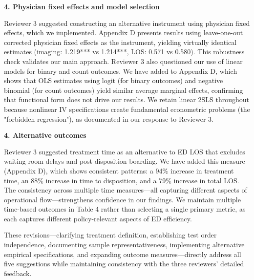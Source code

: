 \documentclass[11pt]{article}
\newcommand{\1}{\hbox{\rm 1\kern-.35em 1}}
\begin{document}
\textbf{4. Physician fixed effects and model selection}

Reviewer 3 suggested constructing an alternative instrument using physician fixed effects, which we implemented. Appendix D presents results using leave-one-out corrected physician fixed effects as the instrument, yielding virtually identical estimates (imaging: 1.219*** vs 1.214***, LOS: 0.571 vs 0.580). This robustness check validates our main approach. Reviewer 3 also questioned our use of linear models for binary and count outcomes. We have added to Appendix D, which shows that OLS estimates using logit (for binary outcomes) and negative binomial (for count outcomes) yield similar average marginal effects, confirming that functional form does not drive our results. We retain linear 2SLS throughout because nonlinear IV specifications create fundamental econometric problems (the "forbidden regression"), as documented in our response to Reviewer 3.

\textbf{4. Alternative outcomes}

Reviewer 3 suggested treatment time as an alternative to ED LOS that excludes waiting room delays and post-disposition boarding. We have added this measure (Appendix D), which shows consistent patterns: a 94\% increase in treatment time, an 88\% increase in time to disposition, and a 79\% increase in total LOS. The consistency across multiple time measures—all capturing different aspects of operational flow—strengthens confidence in our findings. We maintain multiple time-based outcomes in Table 4 rather than selecting a single primary metric, as each captures different policy-relevant aspects of ED efficiency.

These revisions—clarifying treatment definition, establishing test order independence, documenting sample representativeness, implementing alternative empirical specifications, and expanding outcome measures—directly address all five suggestions while maintaining consistency with the three reviewers' detailed feedback.
\color{black}



\clearpage

\end{document}
